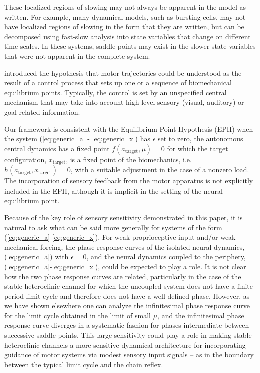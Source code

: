 These localized regions of slowing may not always be apparent in the model
as written.  For example, many dynamical models, such as bursting cells, may
not have localized regions of slowing in the form that they are written, but
can be decomposed using fast-slow analysis into state variables that change
on different time scales.  In these systems, saddle
points may exist in the slower state variables that were not apparent in the
complete system.

\citet{feldman_functional_1966} introduced the
hypothesis that motor trajectories could be understood as the result of a
control process that sets up one or a sequence of biomechanical equilibrium
points.  Typically, the control is set by an unspecified central mechanism that
may take into account high-level sensory (visual, auditory) or goal-related
information.

Our framework is consistent with the Equilibrium Point Hypothesis (EPH) when
the system (\ref{eq:generic_a} - \ref{eq:generic_x}) has $\epsilon$ set to
zero, the autonomous central dynamics has a fixed point $f(a_{\textrm{target}},
\mu) = 0$ for which the target configuration, $x_{\textrm{target}}$, is a fixed
point of the biomechanics, i.e. $h(a_{\textrm{target}}, x_{\textrm{target}}) =
0$, with a suitable adjustment in the case of a nonzero load.  The
incorporation of sensory feedback from the motor apparatus is not explicitly
included in the EPH, although it is implicit in the setting of the neural
equilibrium point.

Because of the key role of sensory sensitivity demonstrated in this paper, it
is natural to ask what can be said more generally for systems of the form
(\ref{eq:generic_a}-\ref{eq:generic_x}).  For weak proprioceptive input and/or
weak mechanical forcing, the phase response curves of the isolated neural
dynamics, (\ref{eq:generic_a}) with $\epsilon=0$, and the neural
dynamics coupled to the periphery, (\ref{eq:generic_a}-\ref{eq:generic_x}),
could be expected to play a role. It is not clear how the two phase response
curves are related,
particularly in the case of the stable heteroclinic channel for which the
uncoupled system does not have a finite period limit cycle and therefore does
not have a
well defined phase. However, as we have shown elsewhere \citep{shaw_phase_2012}
one can analyze the infinitesimal phase response curve for the limit cycle
obtained in the limit of small $\mu$, and the infinitesimal phase response
curve diverges in a systematic fashion for phases intermediate between
successive saddle points. This large sensitivity could play a role in making
stable heteroclinic channels a more sensitive dynamical architecture for
incorporating guidance of motor systems via modest sensory input signals -- as
in the boundary between the typical limit cycle and the chain reflex.


